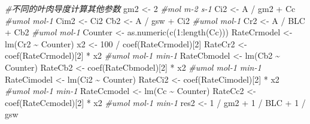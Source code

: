 \documentclass[
]{krantz}
\makeatletter
\newenvironment{Shaded}{\begin{snugshade}}{\end{snugshade}}
\newcommand{\CommentTok}[1]{\textcolor[rgb]{0.56,0.35,0.01}{\textit{#1}}}
\newcommand{\DecValTok}[1]{\textcolor[rgb]{0.00,0.00,0.81}{#1}}
\newcommand{\FunctionTok}[1]{\textcolor[rgb]{0.00,0.00,0.00}{#1}}
\newcommand{\NormalTok}[1]{#1}
\newcommand{\OtherTok}[1]{\textcolor[rgb]{0.56,0.35,0.01}{#1}}
\newcommand{\SpecialCharTok}[1]{\textcolor[rgb]{0.00,0.00,0.00}{#1}}
\newenvironment{kframe}{%
\medskip{}
\setlength{\fboxsep}{.8em}
 \def\at@end@of@kframe{}%
 \ifinner\ifhmode%
  \def\at@end@of@kframe{\end{minipage}}%
  \begin{minipage}{\columnwidth}%
 \fi\fi%
 \def\FrameCommand##1{\hskip\@totalleftmargin \hskip-\fboxsep
 \colorbox{shadecolor}{##1}\hskip-\fboxsep
     \hskip-\linewidth \hskip-\@totalleftmargin \hskip\columnwidth}%
 \MakeFramed {\advance\hsize-\width
   \@totalleftmargin\z@ \linewidth\hsize
   \@setminipage}}%
 {\par\unskip\endMakeFramed%
 \at@end@of@kframe}
\renewenvironment{Shaded}{\begin{kframe}}{\end{kframe}}
\makeatother
\begin{document}
\begin{Shaded}
\begin{Highlighting}[]
\CommentTok{\#不同的叶肉导度计算其他参数}
\NormalTok{gm2 }\OtherTok{\textless{}{-}} \DecValTok{2} \CommentTok{\#mol m{-}2 s{-}1}
\NormalTok{Ci2 }\OtherTok{\textless{}{-}}\NormalTok{ A }\SpecialCharTok{/}\NormalTok{ gm2 }\SpecialCharTok{+}\NormalTok{ Cc }\CommentTok{\#umol mol{-}1}
\NormalTok{Cim2 }\OtherTok{\textless{}{-}}\NormalTok{ Ci2}
\NormalTok{Cb2 }\OtherTok{\textless{}{-}}\NormalTok{ A }\SpecialCharTok{/}\NormalTok{ gsw }\SpecialCharTok{+}\NormalTok{ Ci2 }\CommentTok{\#umol mol{-}1}
\NormalTok{Cr2 }\OtherTok{\textless{}{-}}\NormalTok{ A }\SpecialCharTok{/}\NormalTok{ BLC }\SpecialCharTok{+}\NormalTok{ Cb2 }\CommentTok{\#umol mol{-}1}
\NormalTok{Counter }\OtherTok{\textless{}{-}} \FunctionTok{as.numeric}\NormalTok{(}\FunctionTok{c}\NormalTok{(}\DecValTok{1}\SpecialCharTok{:}\FunctionTok{length}\NormalTok{(Cc)))}
\NormalTok{RateCrmodel }\OtherTok{\textless{}{-}} \FunctionTok{lm}\NormalTok{(Cr2 }\SpecialCharTok{\textasciitilde{}}\NormalTok{ Counter)}
\NormalTok{x2 }\OtherTok{\textless{}{-}} \DecValTok{100} \SpecialCharTok{/} \FunctionTok{coef}\NormalTok{(RateCrmodel)[}\DecValTok{2}\NormalTok{] }
\NormalTok{RateCr2 }\OtherTok{\textless{}{-}} \FunctionTok{coef}\NormalTok{(RateCrmodel)[}\DecValTok{2}\NormalTok{] }\SpecialCharTok{*}\NormalTok{ x2 }\CommentTok{\#umol mol{-}1 min{-}1}
\NormalTok{RateCbmodel }\OtherTok{\textless{}{-}} \FunctionTok{lm}\NormalTok{(Cb2 }\SpecialCharTok{\textasciitilde{}}\NormalTok{ Counter)}
\NormalTok{RateCb2 }\OtherTok{\textless{}{-}} \FunctionTok{coef}\NormalTok{(RateCbmodel)[}\DecValTok{2}\NormalTok{] }\SpecialCharTok{*}\NormalTok{ x2 }\CommentTok{\#umol mol{-}1 min{-}1}
\NormalTok{RateCimodel }\OtherTok{\textless{}{-}} \FunctionTok{lm}\NormalTok{(Ci2 }\SpecialCharTok{\textasciitilde{}}\NormalTok{ Counter)}
\NormalTok{RateCi2 }\OtherTok{\textless{}{-}} \FunctionTok{coef}\NormalTok{(RateCimodel)[}\DecValTok{2}\NormalTok{] }\SpecialCharTok{*}\NormalTok{ x2 }\CommentTok{\#umol mol{-}1 min{-}1}
\NormalTok{RateCcmodel }\OtherTok{\textless{}{-}} \FunctionTok{lm}\NormalTok{(Cc }\SpecialCharTok{\textasciitilde{}}\NormalTok{ Counter)}
\NormalTok{RateCc2 }\OtherTok{\textless{}{-}} \FunctionTok{coef}\NormalTok{(RateCcmodel)[}\DecValTok{2}\NormalTok{] }\SpecialCharTok{*}\NormalTok{ x2 }\CommentTok{\#umol mol{-}1 min{-}1}
\NormalTok{res2 }\OtherTok{\textless{}{-}} \DecValTok{1} \SpecialCharTok{/}\NormalTok{ gm2 }\SpecialCharTok{+} \DecValTok{1} \SpecialCharTok{/}\NormalTok{ BLC }\SpecialCharTok{+} \DecValTok{1} \SpecialCharTok{/}\NormalTok{ gsw}


\end{Highlighting}
\end{Shaded}
\end{document}
